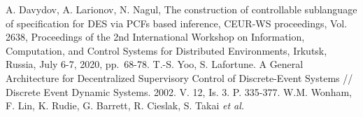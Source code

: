 \documentclass[runningheads]{llncs}
\begin{document}
\begin{thebibliography}{999}
       A. Davydov, A. Larionov, N. Nagul, The construction of controllable sublanguage of specification for DES via PCFs based inference, CEUR-WS proceedings, Vol. 2638, Proceedings of the 2nd International Workshop on Information, Computation, and Control Systems for Distributed Environments, Irkutsk, Russia, July 6-7, 2020, pp.~68-78.
       T.-S. Yoo, S. Lafortune. A General Architecture for Decentralized Supervisory Control of Discrete-Event Systems // Discrete Event Dynamic Systems. 2002. V. 12, Is. 3. P. 335-377.
       W.M. Wonham, F. Lin, K. Rudie, G. Barrett, R. Cieslak, S. Takai \emph{et al.}
      \bibitem{}
      \bibitem{}
      \bibitem{}
      \bibitem{}
      \bibitem{}
      \bibitem{}
      \bibitem{}
      \bibitem{}
      \bibitem{}
      \bibitem{}
\end{thebibliography}
\end{document}
